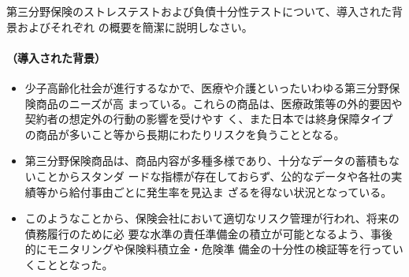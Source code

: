 \documentclass[report,gutter=10mm,fore-edge=10mm,uplatex,dvipdfmx]{jlreq}
\begin{document}
第三分野保険のストレステストおよび負債十分性テストについて、導入された背景およびそれぞれ
の概要を簡潔に説明しなさい。
\paragraph{（導入された背景）}
\begin{itemize}
 \item 少子高齢化社会が進行するなかで、医療や介護といったいわゆる第三分野保険商品のニーズが高
まっている。これらの商品は、医療政策等の外的要因や契約者の想定外の行動の影響を受けやす
く、また日本では終身保障タイプの商品が多いこと等から長期にわたりリスクを負うこととなる。
 \item 第三分野保険商品は、商品内容が多種多様であり、十分なデータの蓄積もないことからスタンダ
ードな指標が存在しておらず、公的なデータや各社の実績等から給付事由ごとに発生率を見込ま
ざるを得ない状況となっている。
 \item このようなことから、保険会社において適切なリスク管理が行われ、将来の債務履行のために必
要な水準の責任準備金の積立が可能となるよう、事後的にモニタリングや保険料積立金・危険準
備金の十分性の検証等を行っていくこととなった。
\end{itemize}
\end{document}
